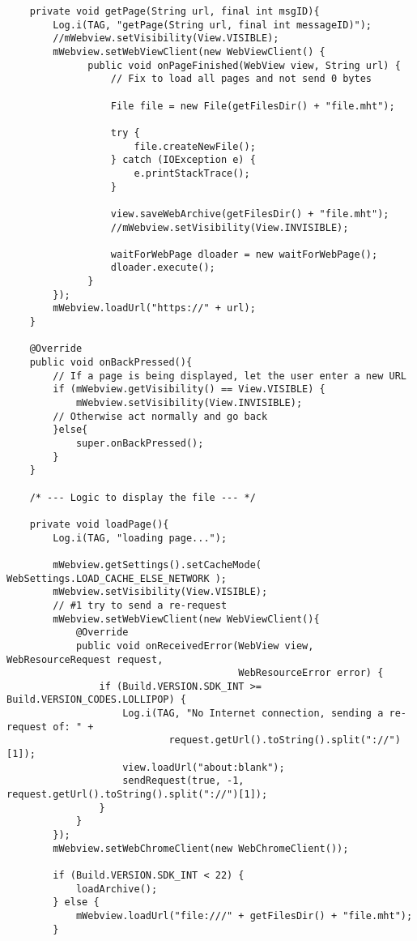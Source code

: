 \begin{verbatim}
    private void getPage(String url, final int msgID){
        Log.i(TAG, "getPage(String url, final int messageID)");
        //mWebview.setVisibility(View.VISIBLE);
        mWebview.setWebViewClient(new WebViewClient() {
              public void onPageFinished(WebView view, String url) {
                  // Fix to load all pages and not send 0 bytes

                  File file = new File(getFilesDir() + "file.mht");

                  try {
                      file.createNewFile();
                  } catch (IOException e) {
                      e.printStackTrace();
                  }

                  view.saveWebArchive(getFilesDir() + "file.mht");
                  //mWebview.setVisibility(View.INVISIBLE);

                  waitForWebPage dloader = new waitForWebPage();
                  dloader.execute();
              }
        });
        mWebview.loadUrl("https://" + url);
    }

    @Override
    public void onBackPressed(){
        // If a page is being displayed, let the user enter a new URL
        if (mWebview.getVisibility() == View.VISIBLE) {
            mWebview.setVisibility(View.INVISIBLE);
        // Otherwise act normally and go back
        }else{
            super.onBackPressed();
        }
    }

    /* --- Logic to display the file --- */

    private void loadPage(){
        Log.i(TAG, "loading page...");

        mWebview.getSettings().setCacheMode( WebSettings.LOAD_CACHE_ELSE_NETWORK );
        mWebview.setVisibility(View.VISIBLE);
        // #1 try to send a re-request
        mWebview.setWebViewClient(new WebViewClient(){
            @Override
            public void onReceivedError(WebView view, WebResourceRequest request,
                                        WebResourceError error) {
                if (Build.VERSION.SDK_INT >= Build.VERSION_CODES.LOLLIPOP) {
                    Log.i(TAG, "No Internet connection, sending a re-request of: " +
                            request.getUrl().toString().split("://")[1]);
                    view.loadUrl("about:blank");
                    sendRequest(true, -1, request.getUrl().toString().split("://")[1]);
                }
            }
        });
        mWebview.setWebChromeClient(new WebChromeClient());

        if (Build.VERSION.SDK_INT < 22) {
            loadArchive();
        } else {
            mWebview.loadUrl("file:///" + getFilesDir() + "file.mht");
        }


\end{verbatim}
